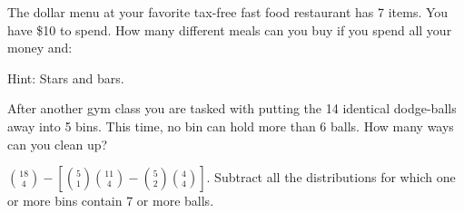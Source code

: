 \begin{questions}

\question The dollar menu at your favorite tax-free fast food restaurant has 7 items.  You have \$10 to spend. How many different meals can you buy if you spend all your money and: 

  \begin{answer}
  Hint: Stars and bars.
  \end{answer}
	
	
	
	
	
\question After another gym class you are tasked with putting the 14 identical dodge-balls away into 5 bins.  This time, no bin can hold more than 6 balls. How many ways can you clean up?


	\begin{answer}
 ${18 \choose 4} - \left[ {5 \choose 1}{11 \choose 4} - {5 \choose 2}{4 \choose 4}\right]$.  Subtract all the distributions for which one or more bins contain 7 or more balls.  %
	\end{answer}	





\end{questions}
